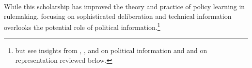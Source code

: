 While this scholarship has improved the theory and practice of policy learning in rulemaking, focusing on sophisticated deliberation and technical information overlooks the potential role of political information.\footnote{but see insights from \citet{Golden1998}, \citet{Nelson2012}, and \citet{Rauch2016} on political information and \citet{Reich1966} and \citet{Seifter2016UCLA} on representation reviewed below.}




























